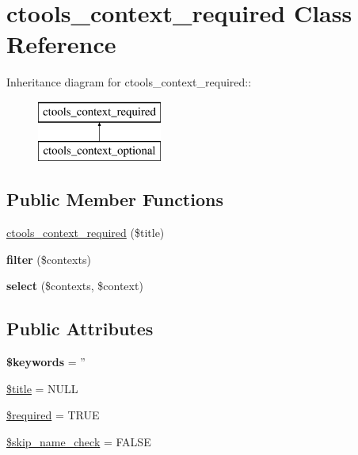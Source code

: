 \hypertarget{classctools__context__required}{
\section{ctools\_\-context\_\-required Class Reference}
\label{classctools__context__required}
}
Inheritance diagram for ctools\_\-context\_\-required::\begin{figure}[H]
\begin{center}
\leavevmode
\includegraphics[height=2cm]{classctools__context__required}
\end{center}
\end{figure}
\subsection*{Public Member Functions}
\begin{DoxyCompactItemize}
\item 
\hyperlink{classctools__context__required_a91ae748df7bbdf6b3651f28c00f365cf}{ctools\_\-context\_\-required} (\$title)
\item 
\hypertarget{classctools__context__required_aff6f4d67ca887dc151fd91e16e64315f}{
{\bfseries filter} (\$contexts)}
\label{classctools__context__required_aff6f4d67ca887dc151fd91e16e64315f}

\item 
\hypertarget{classctools__context__required_a5cabc4ea404ce63d13c1c1ffe2574f74}{
{\bfseries select} (\$contexts, \$context)}
\label{classctools__context__required_a5cabc4ea404ce63d13c1c1ffe2574f74}

\end{DoxyCompactItemize}
\subsection*{Public Attributes}
\begin{DoxyCompactItemize}
\item 
\hypertarget{classctools__context__required_ad6bf4bc9d6644730c068be7ee459717b}{
{\bfseries \$keywords} = ''}
\label{classctools__context__required_ad6bf4bc9d6644730c068be7ee459717b}

\item 
\hyperlink{classctools__context__required_a914ddf3d2e10cca70703d3c879c5d225}{\$title} = NULL
\item 
\hyperlink{classctools__context__required_a392adc1ecb046f17494d848d9fd02a66}{\$required} = TRUE
\item 
\hyperlink{classctools__context__required_aa0e1bade9610c1ab52df3ac440e82e22}{\$skip\_\-name\_\-check} = FALSE
\end{DoxyCompactItemize}


